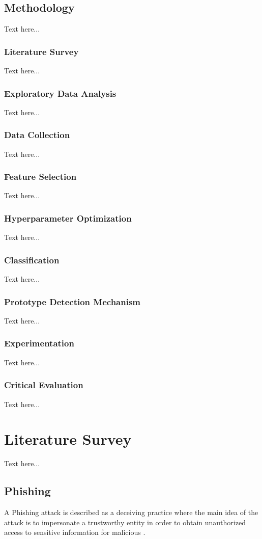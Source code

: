 \documentclass{sigkddExp}
\begin{document}
\subsection{Methodology}
Text here...

\subsubsection{Literature Survey}
Text here...
\subsubsection{Exploratory Data Analysis}
Text here...
\subsubsection{Data Collection}
Text here...
\subsubsection{Feature Selection}
Text here...
\subsubsection{Hyperparameter Optimization}
Text here...
\subsubsection{Classification}
Text here...
\subsubsection{Prototype Detection Mechanism}
Text here...
\subsubsection{Experimentation}
Text here...
\subsubsection{Critical Evaluation}
Text here...
\cite{bowman:reasoning}

\section{Literature Survey}
Text here...
\subsection{Phishing}
A Phishing attack is described as a deceiving practice where the main idea of the attack is to impersonate a trustworthy entity in order to obtain unauthorized access to sensitive information for malicious \cite{10.5555/1071752.1071800, Ramzan2010}.
\end{document}
